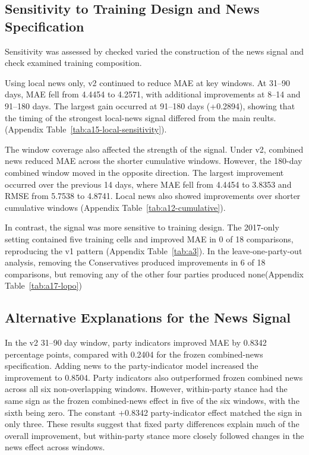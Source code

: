 \documentclass[final-report]{report-template}
\begin{document}
\subsection{Sensitivity to Training Design and News Specification}
\label{sec:sensitivity}
Sensitivity was assessed by checked varied the construction of the news signal and check examined training composition.

Using local news only, v2 continued to reduce MAE at key windows. At 31--90 days, MAE fell from 4.4454 to 4.2571, with additional improvements at 8--14 and 91--180 days. The largest gain occurred at 91--180 days (+0.2894), showing that the timing of the strongest local-news signal differed from the main reults. (Appendix Table~\ref{tab:a15-local-sensitivity}).

The window coverage also affected the strength of the signal. Under v2, combined news reduced MAE across the shorter cumulative windows. However, the 180-day combined window moved in the opposite direction. The largest improvement occurred over the previous 14 days, where MAE fell from 4.4454 to 3.8353 and RMSE from 5.7538 to 4.8741. Local news also showed improvements over shorter cumulative windows (Appendix Table~\ref{tab:a12-cumulative}).

In contrast, the signal was more sensitive to training design. The 2017-only setting contained five training cells and improved MAE in 0 of 18 comparisons, reproducing the v1 pattern (Appendix Table~\ref{tab:a3}). In the leave-one-party-out analysis, removing the Conservatives produced improvements in 6 of 18 comparisons, but removing any of the other four parties produced none(Appendix Table~\ref{tab:a17-lopo})

\subsection{Alternative Explanations for the News Signal}
\label{sec:news-signal-diagnostics}

In the v2 31--90 day window, party indicators improved MAE by 0.8342 percentage points, compared with 0.2404 for the frozen combined-news specification. Adding news to the party-indicator model increased the improvement to 0.8504. Party indicators also outperformed frozen combined news across all six non-overlapping windows. However, within-party stance had the same sign as the frozen combined-news effect in five of the six windows, with the sixth being zero. The constant +0.8342 party-indicator effect matched the sign in only three. These results suggest that fixed party differences explain much of the overall improvement, but within-party stance more closely followed changes in the news effect across windows.
\end{document}
